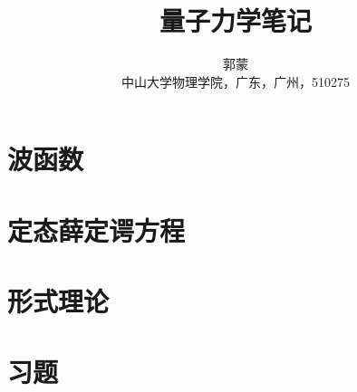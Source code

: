\documentclass[10pt,oneside,UTF8]{book}
\title{\fontsize{30pt}{30pt}\textbf{量子力学笔记}}
\author
	{\kaishu 郭蒙 \\
	\kaishu 中山大学物理学院，广东，广州，510275} %
\date{}
\numberwithin{equation}{section} %
\begin{document}
	\maketitle  %
\newpage
{}  %
\setcounter{page}{1}
\tableofcontents
\newpage
\setcounter{page}{1}	%
	\chapter{波函数}
	
	\chapter{定态薛定谔方程}
	
	\chapter{形式理论}
	

	\chapter{习题}
	
\end{document}
